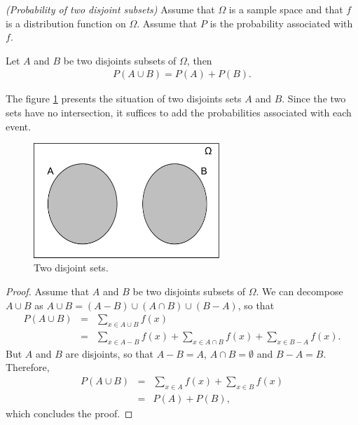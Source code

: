 \begin{proposition}
\emph{(Probability of two disjoint subsets)}
\label{introstats-propopdisjoint}
Assume that $\Omega$ is a sample space and that $f$ is a distribution
function on $\Omega$. Assume that $P$ is the probability associated with
$f$.

Let $A$ and $B$ be two disjoints subsets of $\Omega$, then 
\begin{eqnarray}
P(A \cup B ) = P(A) + P(B)\label{introstats-pdisjointssum}.
\end{eqnarray}
\end{proposition}

The figure \ref{fig-introstats-disjointsets} presents the situation
of two disjoints sets $A$ and $B$. Since the two sets have no 
intersection, it suffices to add the probabilities associated 
with each event.

\begin{figure}
\begin{center}
\includegraphics[width=7cm]{introdiscreteprobas/sets-disjointunion.pdf}
\end{center}
\caption{Two disjoint sets.}
\label{fig-introstats-disjointsets}
\end{figure}

\begin{proof}
Assume that $A$ and $B$ be two disjoints subsets of $\Omega$.
We can decompose $A\cup B$ as $A\cup B = (A-B) \cup (A\cap B) \cup (B-A)$, so that 
\begin{eqnarray}
P(A \cup B ) &=& \sum_{x\in A\cup B} f(x) \\
&=& \sum_{x\in A- B} f(x) + \sum_{x\in A\cap B} f(x) + \sum_{x\in B- A} f(x).
\end{eqnarray}
But $A$ and $B$ are disjoints, so that $A-B = A$, $A\cap B = \emptyset$
and $B-A = B$. Therefore,
\begin{eqnarray}
P(A \cup B ) &=& \sum_{x\in A} f(x) + \sum_{x\in B} f(x)\\
&=&P(A) + P(B),
\end{eqnarray}
which concludes the proof. 
\end{proof}

